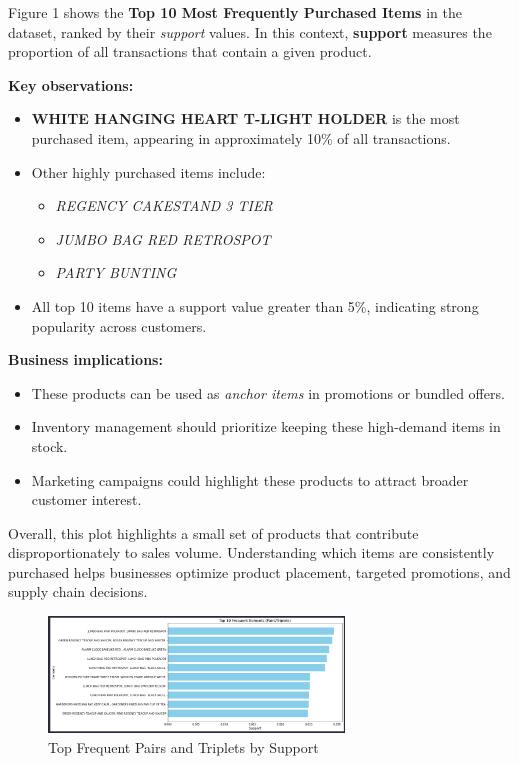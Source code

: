 \documentclass[12pt]{article}
\begin{document}
\vspace{0.2cm}

Figure 1 shows the \textbf{Top 10 Most Frequently Purchased Items} in the dataset, ranked by their \textit{support} values. In this context, \textbf{support} measures the proportion of all transactions that contain a given product.

\vspace{0.3cm}

\textbf{Key observations:}
\begin{itemize}
    \item \textbf{WHITE HANGING HEART T-LIGHT HOLDER} is the most purchased item, appearing in approximately 10\% of all transactions.
    \item Other highly purchased items include:
    \begin{itemize}
        \item \textit{REGENCY CAKESTAND 3 TIER}
        \item \textit{JUMBO BAG RED RETROSPOT}
        \item \textit{PARTY BUNTING}
    \end{itemize}
    \item All top 10 items have a support value greater than 5\%, indicating strong popularity across customers.
\end{itemize}

\vspace{0.3cm}

\textbf{Business implications:}
\begin{itemize}
    \item These products can be used as \textit{anchor items} in promotions or bundled offers.
    \item Inventory management should prioritize keeping these high-demand items in stock.
    \item Marketing campaigns could highlight these products to attract broader customer interest.
\end{itemize}

\vspace{0.3cm}

Overall, this plot highlights a small set of products that contribute disproportionately to sales volume. Understanding which items are consistently purchased helps businesses optimize product placement, targeted promotions, and supply chain decisions.


\begin{figure}[H]
    \centering
    \includegraphics[width=0.7\textwidth]{images/top_10_freq_sets.png}
    \caption{Top Frequent Pairs and Triplets by Support}
\end{figure}
\end{document}
